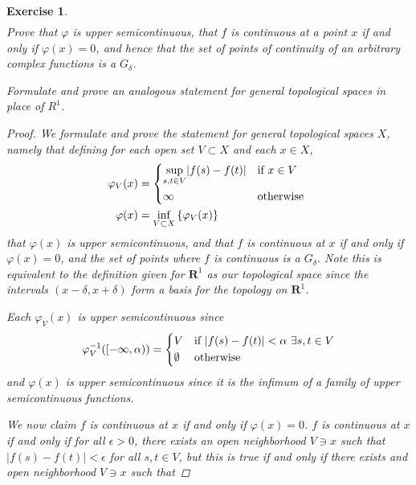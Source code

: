 \documentclass[10pt,letterpaper]{amsart}
\newtheorem{exercise}{Exercise}[section]
\theoremstyle{definition}
\theoremstyle{remark}
\numberwithin{equation}{exercise}
\begin{document}
\begin{multicols}{2}
\begin{exercise}
\begin{align*}
    \end{align*}
    Prove that $\varphi$ is upper semicontinuous, that $f$ is continuous at a
    point $x$ if and only if $\varphi(x) = 0$, and hence that the set of points
    of continuity of an arbitrary complex functions is a $G_\delta$.
    \par Formulate and prove an analogous statement for general topological
    spaces in place of $R^1$.
    \begin{proof}
      We formulate and prove the statement for general topological spaces $X$,
      namely that defining for each open set $V \subset X$ and each $x \in X$,
      \begin{align*}
        \varphi_V(x) &= \begin{dcases*}
          \sup_{s,t \in V} \lvert f(s) - f(t)\rvert & if $x \in V$\\
          \infty & otherwise
        \end{dcases*}\\
        \varphi(x) &= \inf_{V \subset X}\left\{ \varphi_V(x) \right\}
      \end{align*}
      that $\varphi(x)$ is upper
      semicontinuous, and that $f$ is continuous at $x$ if and only if
      $\varphi(x) = 0$, and the set of points where $f$ is continuous is a
      $G_\delta$. Note this is equivalent to the definition given for
      $\mathbf{R}^1$ as our topological space since the intervals $(x - \delta,
      x + \delta)$ form a basis for the topology on $\mathbf{R}^1$.
      \par Each $\varphi_V(x)$ is upper semicontinuous since
      \begin{equation*}
        \varphi_V^{-1}([-\infty,\alpha)) = \begin{dcases*}
          V & if $\lvert f(s) - f(t) \rvert < \alpha$ $\exists s,t\in V$\\
          \emptyset & otherwise
        \end{dcases*}
      \end{equation*}
      and $\varphi(x)$ is upper semicontinuous since it is the infimum of a
      family of upper semicontinuous functions.
      \par We now claim $f$ is continuous at $x$ if and only if $\varphi(x) =
      0$. $f$ is continuous at $x$ if and only if for all $\epsilon > 0$, there
      exists an open neighborhood $V \ni x$ such that $\lvert f(s) - f(t) \rvert
      < \epsilon$ for all $s,t \in V$, but this is true if and only if
      there exists and open neighborhood $V \ni x$ such that

\end{proof}
\end{exercise}
\end{multicols}
\end{document}
